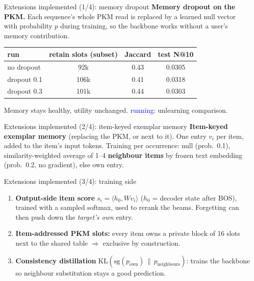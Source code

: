 \documentclass{beamer}
\newcommand{\strun}{\textcolor{blue}{running}}
\begin{document}
\begin{frame}{Extensions implemented (1/4): memory dropout}
\textbf{Memory dropout on the PKM.} Each sequence's whole PKM read is replaced by
a learned null vector with probability $p$ during training, so the backbone works
without a user's memory contribution.
\begin{center}
\small
\begin{tabular}{|l|c|c|c|}
\hline
run & retain slots (subset) & Jaccard & test N@10 \\
\hline
no dropout       & 92k  & 0.43 & 0.0305 \\
dropout 0.1      & 106k & 0.41 & 0.0318 \\
dropout 0.3      & 101k & 0.44 & 0.0303 \\
\hline
\end{tabular}
\end{center}
Memory stays healthy, utility unchanged. \strun: unlearning comparison.
\end{frame}

\begin{frame}{Extensions implemented (2/4): item-keyed exemplar memory}
\textbf{Item-keyed exemplar memory} (replacing the PKM, or next to it). One
entry $v_i$ per item, added to the item's input tokens. Training per occurrence:
null (prob.\ 0.1), similarity-weighted average of 1--4 \textbf{neighbour items}
by frozen text embedding (prob.\ 0.2, no gradient), else own entry.
\end{frame}

\begin{frame}{Extensions implemented (3/4): training side}
\begin{enumerate}
  \item \textbf{Output-side item score} $s_i = \langle h_0, W v_i\rangle$
        ($h_0$ = decoder state after BOS), trained with a sampled softmax,
        used to rerank the beams. Forgetting can then push down the
        \emph{target's own} entry.
  \item \textbf{Item-addressed PKM slots:} every item owns a private block of 16
        slots next to the shared table $\Rightarrow$ exclusive by construction.
  \item \textbf{Consistency distillation}
        KL$(\text{sg}(p_{\text{own}})\,\|\,p_{\text{neighbours}})$: trains the
        backbone so neighbour substitution stays a good prediction.
\end{enumerate}
\end{frame}
\end{document}
